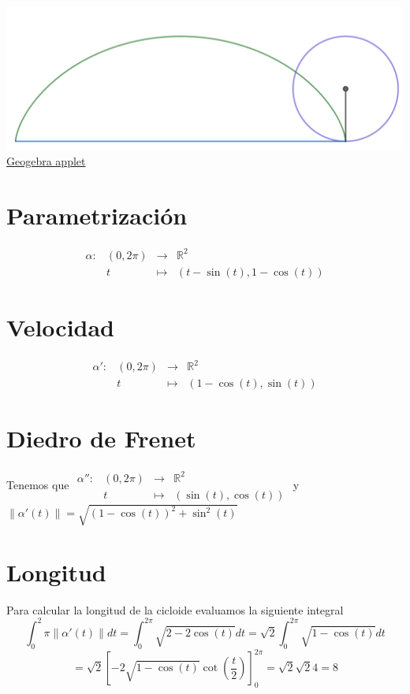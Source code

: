 \documentclass{article}
\newcommand{\bb}[1]{\mathbb{#1}}
\newcommand{\R}{\bb{R}}
\begin{document}
\begin{center}
\begin{align*}
\end{align*}
\includegraphics[scale=0.3]{figuras/cicloide descipcion 5.PNG}\\
\href{https://www.geogebra.org/calculator/ju6wnwpc}{Geogebra applet}
\end{center}
\section{Parametrización}
$$
\begin{array}{crcl}
\alpha : & (0,2\pi) & \longrightarrow & \bb{R}^2 \\
& t & \longmapsto     & (t-\sin(t),1-\cos(t))
\end{array}
$$
\section{Velocidad}
$$
\begin{array}{crcl}
\alpha' : & (0,2\pi) & \longrightarrow & \bb{R}^2 \\
& t & \longmapsto     & (1-\cos(t),\sin(t))
\end{array}
$$
\section{Diedro de Frenet}
Tenemos que $\begin{array}{crcl}
\alpha'' : & (0,2\pi) & \longrightarrow & \R^2 \\
& t & \longmapsto     & (\sin(t),\cos(t))
\end{array}$ y $\left\| \alpha'(t) \right\|=\sqrt{(1-\cos(t))^2+\sin^2(t)}$
\section{Longitud}
Para calcular la longitud de la cicloide evaluamos la siguiente integral
$$
\int_0^2\pi \left\| \alpha'(t) \right\| dt = \int_0^{2\pi} \sqrt{2-2\cos(t)} dt =\sqrt{2} \int_0^{2\pi} \sqrt{1-\cos(t)} dt
$$
$$
= \sqrt{2}\left[ -2 \sqrt{1-\cos(t)}\cot\left(\frac{t}{2}\right)\right]_0^{2\pi} = \sqrt{2}\sqrt{2}4=8
$$
\end{document}
